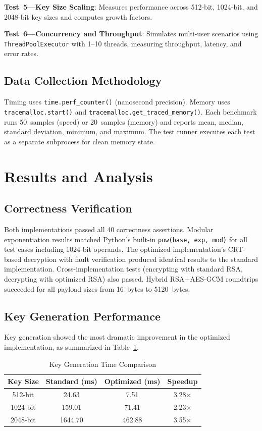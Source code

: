 \documentclass[conference]{IEEEtran}
\begin{document}
\textbf{Test~5---Key Size Scaling}: Measures performance across 512-bit, 1024-bit, and 2048-bit key sizes and computes growth factors.

\textbf{Test~6---Concurrency and Throughput}: Simulates multi-user scenarios using \texttt{ThreadPoolExecutor} with 1--10 threads, measuring throughput, latency, and error rates.

\subsection{Data Collection Methodology}

Timing uses \texttt{time.perf\_counter()} (nanosecond precision). Memory uses \texttt{tracemalloc.start()} and \texttt{tracemalloc.get\_traced\_memory()}. Each benchmark runs 50~samples (speed) or 20~samples (memory) and reports mean, median, standard deviation, minimum, and maximum. The test runner executes each test as a separate subprocess for clean memory state.

\section{Results and Analysis}
\label{sec:results}

\subsection{Correctness Verification}

Both implementations passed all 40 correctness assertions. Modular exponentiation results matched Python's built-in \texttt{pow(base, exp, mod)} for all test cases including 1024-bit operands. The optimized implementation's CRT-based decryption with fault verification produced identical results to the standard implementation. Cross-implementation tests (encrypting with standard RSA, decrypting with optimized RSA) also passed. Hybrid RSA+AES-GCM roundtrips succeeded for all payload sizes from 16~bytes to 5120~bytes.

\subsection{Key Generation Performance}

Key generation showed the most dramatic improvement in the optimized implementation, as summarized in Table~\ref{tab:keygen}.

\begin{table}[htbp]
\caption{Key Generation Time Comparison}
\begin{center}
\begin{tabular}{|c|c|c|c|}
\hline
\textbf{Key Size} & \textbf{Standard (ms)} & \textbf{Optimized (ms)} & \textbf{Speedup} \\
\hline
512-bit & 24.63 & 7.51 & 3.28$\times$ \\
\hline
1024-bit & 159.01 & 71.41 & 2.23$\times$ \\
\hline
2048-bit & 1644.70 & 462.88 & 3.55$\times$ \\
\hline
\end{tabular}
\label{tab:keygen}
\end{center}
\end{table}
\end{document}
